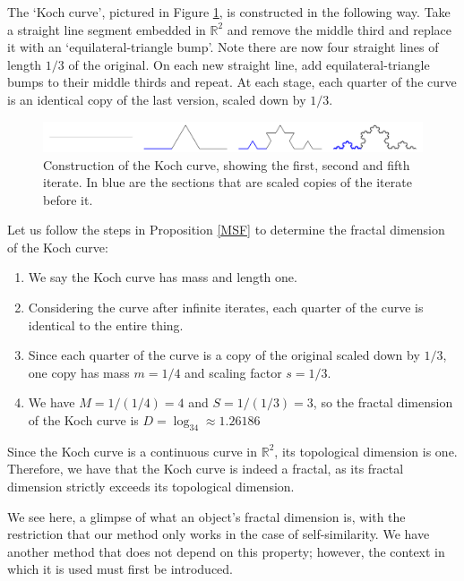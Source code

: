 \begin{exmp}
    The `Koch curve', pictured in Figure \ref{fig:Koch}, is constructed in the following way. Take a straight line segment embedded in $\mathbb{R}^2$ and remove the middle third and replace it with an `equilateral-triangle bump'. Note there are now four straight lines of length $1/3$ of the original. On each new straight line, add equilateral-triangle bumps to their middle thirds and repeat. At each stage, each quarter of the curve is an identical copy of the last version, scaled down by $1/3$.
    \begin{figure}
        \centering
        \includegraphics[width=1\linewidth]{Images/Koch new.png}
        \caption{Construction of the Koch curve, showing the first, second and fifth iterate. In blue are the sections that are scaled copies of the iterate before it.}
        \label{fig:Koch}
    \end{figure}
    Let us follow the steps in Proposition \ref{MSF} to determine the fractal dimension of the Koch curve:
    \begin{enumerate}
        \item We say the Koch curve has mass and length one.
        \item Considering the curve after infinite iterates, each quarter of the curve is identical to the entire thing.
        \item Since each quarter of the curve is a copy of the original scaled down by $1/3$, one copy has mass $m=1/4$ and scaling factor $s=1/3$.
        \item We have $M=1/(1/4)=4$ and $S=1/(1/3)=3$, so the fractal dimension of the Koch curve is $D=\log_34\approx1.26186$
    \end{enumerate}
    Since the Koch curve is a continuous curve in $\mathbb{R}^2$, its topological dimension is one. Therefore, we have that the Koch curve is indeed a fractal, as its fractal dimension strictly exceeds its topological dimension.
\end{exmp}
We see here, a glimpse of what an object's fractal dimension is, with the restriction that our method only works in the case of self-similarity. We have another method that does not depend on this property; however, the context in which it is used must first be introduced.
